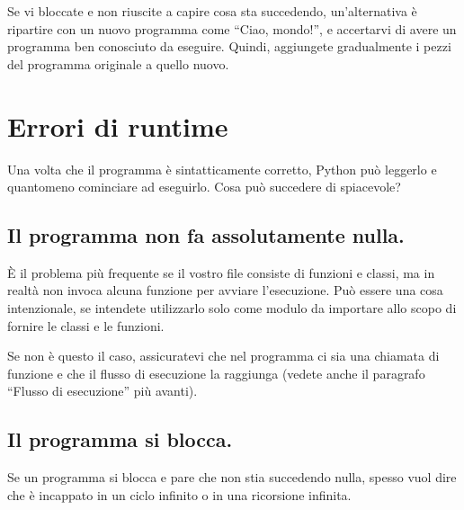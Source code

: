 \documentclass[10pt]{book}
\begin{document}
Se vi bloccate e non riuscite a capire cosa sta succedendo, un'alternativa è ripartire con un nuovo programma come ``Ciao, mondo!'', e accertarvi di avere un programma ben conosciuto da eseguire. Quindi, aggiungete gradualmente i pezzi del programma originale a quello nuovo.


\section{Errori di runtime}

Una volta che il programma è sintatticamente corretto, Python può leggerlo e quantomeno cominciare ad eseguirlo. Cosa può succedere di spiacevole?


\subsection{Il programma non fa assolutamente nulla.}

È il problema più frequente se il vostro file consiste di funzioni e classi, ma in realtà non invoca alcuna funzione per avviare l'esecuzione. Può essere una cosa intenzionale, se intendete utilizzarlo solo come modulo da importare allo scopo di fornire le classi e le funzioni.

Se non è questo il caso, assicuratevi che nel programma ci sia una chiamata di funzione e che il flusso di esecuzione la raggiunga (vedete anche il paragrafo ``Flusso di esecuzione'' più avanti).


\subsection{Il programma si blocca.}

Se un programma si blocca e pare che non stia succedendo nulla, spesso vuol dire che è incappato in un ciclo infinito o in una ricorsione infinita.
\end{document}

